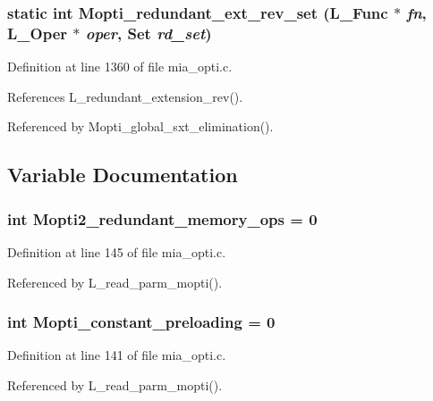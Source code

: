 \subsubsection{\setlength{\rightskip}{0pt plus 5cm}static int Mopti\_\-redundant\_\-ext\_\-rev\_\-set (L\_\-Func $\ast$ {\em fn}, L\_\-Oper $\ast$ {\em oper}, Set {\em rd\_\-set})\hspace{0.3cm}{\tt  [static]}}\label{mia__opti_8c_a3796c3a20e6502bbe4e88682fc485b6}




Definition at line 1360 of file mia\_\-opti.c.

References L\_\-redundant\_\-extension\_\-rev().

Referenced by Mopti\_\-global\_\-sxt\_\-elimination().

\subsection{Variable Documentation}
\subsubsection{\setlength{\rightskip}{0pt plus 5cm}int \bf{Mopti2\_\-redundant\_\-memory\_\-ops} = 0}\label{mia__opti_8c_3080904fd0567421bcd0c45db18b2aab}




Definition at line 145 of file mia\_\-opti.c.

Referenced by L\_\-read\_\-parm\_\-mopti().
\subsubsection{\setlength{\rightskip}{0pt plus 5cm}int \bf{Mopti\_\-constant\_\-preloading} = 0}\label{mia__opti_8c_833cedb394552394eaa0a30f872527ea}




Definition at line 141 of file mia\_\-opti.c.

Referenced by L\_\-read\_\-parm\_\-mopti().
